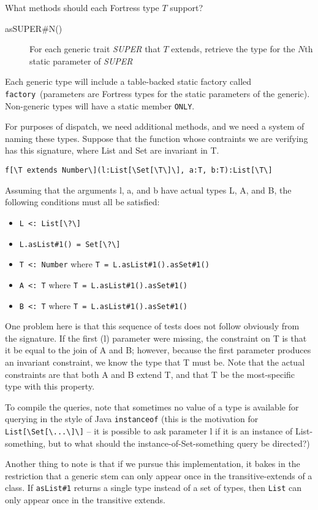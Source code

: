 \documentclass[11pt]{article}
\begin{document}
What methods should each Fortress type $T$ support?
\begin{description}
\item[asSUPER\#N()] For each generic trait {\it SUPER} that $T$ extends, retrieve the type for the $N$th static parameter of {\it SUPER} 
\end{description}
Each generic type will include a table-backed static factory called \verb+factory+\ (parameters are Fortress types for the static parameters of the generic).  Non-generic types will have a static member \verb+ONLY+.  

For purposes of dispatch, we need additional methods, and we need a system of naming these types.  Suppose that the function whose contraints we are verifying has this signature, where List and Set are invariant in T.
\begin{verbatim}
f[\T extends Number\](l:List[\Set[\T\]\], a:T, b:T):List[\T\]
\end{verbatim}
Assuming that the arguments l, a, and b have actual types L, A, and B, the following conditions must all be satisfied:
\begin{itemize}
\item \verb+L <: List[\?\]+
\item \verb+L.asList#1() = Set[\?\]+
\item \verb+T <: Number+ where \verb+T = L.asList#1().asSet#1()+
\item \verb+A <: T+ where \verb+T = L.asList#1().asSet#1()+
\item \verb+B <: T+ where \verb+T = L.asList#1().asSet#1()+
\end{itemize}
One problem here is that this sequence of tests does not follow obviously from the signature.
If the first (l) parameter were missing, the constraint on T is that it be equal to the join of A and B; however, because the first parameter produces an invariant constraint, we know the type that T must be.  Note that the actual constraints are that both A and B extend T, and that T be the most-specific type with this property.

To compile the queries, note that sometimes no value of a type is available for querying in the style of Java \verb+instanceof+ (this is the motivation for \verb+List[\Set[\...\]\]+ -- it is possible to ask parameter l if it is an instance of List-something, but to what should the instance-of-Set-something query be directed?)

Another thing to note is that if we pursue this implementation, it bakes in the restriction that a generic stem can only appear once in the transitive-extends of a class.  If \verb+asList#1+ returns a single type instead of a set of types, then \verb+List+ can only appear once in the transitive extends.
\end{document}
